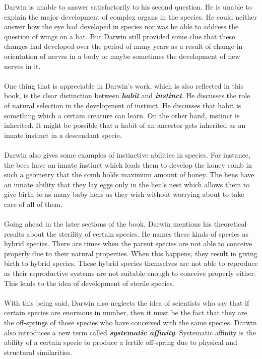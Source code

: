 \documentclass{article}
\begin{document}
	Darwin is unable to answer satisfactorily to his second question. He is unable to explain the major development of complex organs in the species. He could neither answer how the eye had developed in species nor was he able to address the question of wings on a bat. But Darwin still provided some clue that these changes had developed over the period of many years as a result of change in orientation of nerves in a body or maybe sometimes the development of new nerves in it. \\ \\
	One thing that is appreciable in Darwin's work, which is also reflected in this book, is the clear distinction between \textbf{\textit{habit}} and \textbf{\textit{instinct}}. He discusses the role of natural selection in the development of instinct. He discusses that habit is something which a certain creature can learn. On the other hand, instinct is inherited. It might be possible that a habit of an ancestor gets inherited as an innate instinct in a descendant specie. \\ \\
	Darwin also gives some examples of instinctive abilities in species. For instance, the bees have an innate instinct which leads them to develop the honey comb in such a geometry that the comb holds maximum amount of honey. The hens have an innate ability that they lay eggs only in the hen's nest which allows them to give birth to as many baby hens as they wish without worrying about to take care of all of them.  \\ \\
	Going ahead in the later sections of the book, Darwin mentions his theoretical results about the sterility of certain species. He names these kinds of species as hybrid species. There are times when the parent species are not able to conceive properly due to their natural properties. When this happens, they result in giving birth to hybrid species. These hybrid species themselves are not able to reproduce as their reproductive systems are not suitable enough to conceive properly either. This leads to the idea of development of sterile species. \\ \\
	With this being said, Darwin also neglects the idea of scientists who say that if certain species are enormous in number, then it must be the fact that they are the off-springs of those species who have conceived with the same species. Darwin also introduces a new term called \textbf{\textit{systematic affinity}}. Systematic affinity is the ability of a certain specie to produce a fertile off-spring due to physical and structural similarities. \\ \\
\end{document}
